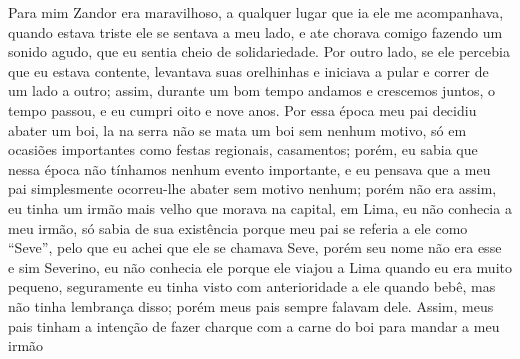 Para mim Zandor era maravilhoso, a qualquer lugar que ia ele me acompanhava, quando estava triste ele se sentava a meu lado, e ate chorava comigo fazendo um sonido agudo, que eu sentia cheio de solidariedade. 
Por outro lado, se ele percebia que eu estava contente, levantava suas orelhinhas e iniciava a pular e correr de um lado a outro; assim, durante um bom tempo andamos e crescemos juntos, o tempo passou, e eu cumpri oito e nove anos.
Por essa época meu pai decidiu abater um boi, la na serra não se mata um boi sem nenhum motivo, só em ocasiões importantes como festas regionais, casamentos; porém, eu sabia que nessa época não tínhamos nenhum evento importante, e eu pensava que a meu pai simplesmente  ocorreu-lhe abater sem motivo nenhum; porém não era assim, eu tinha um irmão mais velho que morava na capital, em Lima, eu não conhecia a meu irmão, só sabia de sua existência porque meu pai se referia a ele como ``Seve'', pelo que eu achei que ele se chamava Seve, porém seu nome não era esse e sim Severino, eu não conhecia ele porque ele viajou a Lima quando eu era muito pequeno, seguramente eu tinha visto com anterioridade a ele quando bebê, mas não tinha lembrança disso; porém meus pais sempre falavam dele. 
Assim, meus pais tinham a intenção de fazer charque com a carne do boi para mandar a meu irmão 


